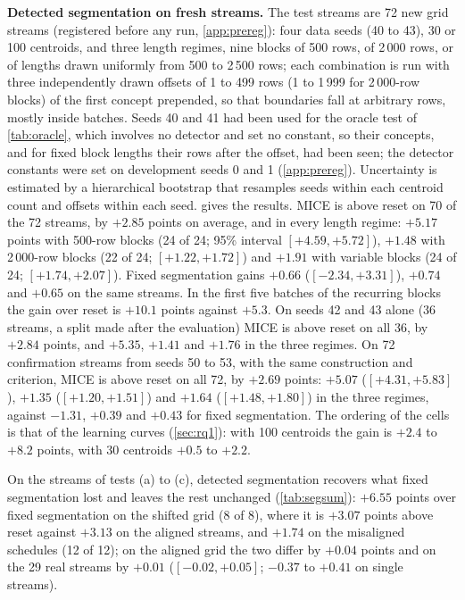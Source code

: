 \documentclass[11pt]{article}
\theoremstyle{plain}
\theoremstyle{definition}
\theoremstyle{remark}
\newcommand{\method}{\textsc{MICE}}   %
\begin{document}
\textbf{Detected segmentation on fresh streams.} The test streams are 72 new grid streams (registered before any run,
\cref{app:prereg}): four data seeds (40 to 43), 30 or 100 centroids, and three length
regimes, nine blocks of 500 rows, of 2\,000 rows, or of lengths drawn uniformly from 500 to 2\,500 rows; each
combination is run with three independently drawn offsets of 1 to 499 rows (1 to 1\,999 for 2\,000-row blocks) of the
first concept prepended, so that boundaries fall at arbitrary rows, mostly inside batches. Seeds 40 and 41 had been used for the oracle test of \cref{tab:oracle}, which involves no
detector and set no constant, so their concepts, and for fixed block lengths their rows after the offset, had been
seen; the detector constants were set on development seeds 0 and 1 (\cref{app:prereg}). Uncertainty is estimated by a
hierarchical bootstrap that resamples seeds within each centroid count and offsets within each seed.
 gives the results. \method{} is above reset on 70 of the 72 streams, by $+2.85$ points on average,
and in every length regime: $+5.17$ points with 500-row blocks (24 of 24; 95\% interval $[+4.59,+5.72]$), $+1.48$
with 2\,000-row blocks (22 of 24; $[+1.22,+1.72]$) and $+1.91$ with variable blocks (24 of 24; $[+1.74,+2.07]$). Fixed
segmentation gains $+0.66$ ($[-2.34,+3.31]$), $+0.74$ and $+0.65$ on the same streams. In the first five batches of
the recurring blocks the gain over reset is $+10.1$ points against $+5.3$. On seeds 42 and 43 alone (36 streams, a split made after the evaluation) \method{} is above reset on all 36,
by $+2.84$ points, and $+5.35$, $+1.41$ and $+1.76$ in the three regimes. On 72 confirmation streams from seeds 50 to
53, with the same construction and criterion, \method{} is above reset on all 72, by $+2.69$ points: $+5.07$
($[+4.31,+5.83]$), $+1.35$ ($[+1.20,+1.51]$) and $+1.64$ ($[+1.48,+1.80]$) in the three regimes, against $-1.31$,
$+0.39$ and $+0.43$ for fixed segmentation. The ordering of the cells is that of the
learning curves (\cref{sec:rq1}): with 100 centroids the gain is $+2.4$ to $+8.2$ points, with 30 centroids $+0.5$ to
$+2.2$.

On the streams of tests (a) to (c), detected segmentation recovers what fixed segmentation lost and leaves the
rest unchanged (\cref{tab:segsum}): $+6.55$ points over fixed segmentation on the shifted grid (8 of 8), where it is
$+3.07$ points above reset against $+3.13$ on the aligned streams, and $+1.74$ on the misaligned schedules (12 of 12);
on the aligned grid the two differ by $+0.04$ points and on the 29 real streams by $+0.01$ ($[-0.02,+0.05]$; $-0.37$
to $+0.41$ on single streams).
\end{document}

